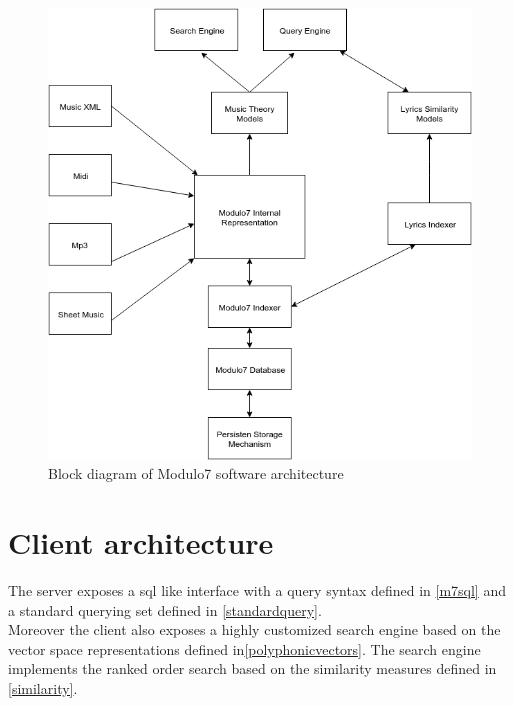 \begin{figure}
\centering
\includegraphics[width=\textwidth]{Modulo7Architecture.png}
\makeatletter
\let\@currsize\normalsize
\caption{Block diagram of Modulo7 software architecture}
\label{fig:Architectural Design}
\end{figure}
\newpage
\section{Client architecture}
\noindent The server exposes a sql like interface with a query syntax defined in \ref{m7sql} and a standard querying set defined in \ref{standardquery}. \\

\noindent Moreover the client also exposes a highly customized search engine based on the vector space representations defined in\ref{polyphonicvectors}. The search engine implements the ranked order search based on the similarity measures defined in \ref{similarity}. 

